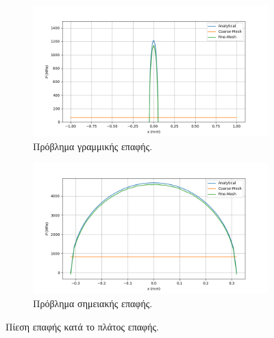 \documentclass{article}
\begin{document}
\begin{figure}[H]
    \centering
    \begin{subfigure}{0.49\linewidth}
        \centering
        \includegraphics[width=\linewidth]{media/plin.png}
        \caption{Πρόβλημα γραμμικής επαφής.}
    \end{subfigure}
    \hfill
    \begin{subfigure}{0.49\linewidth}
        \centering
        \includegraphics[width=\linewidth]{media/pp.png}
        \caption{Πρόβλημα σημειακής επαφής.}
    \end{subfigure}
    \caption{Πίεση επαφής κατά το πλάτος επαφής.}
    \label{fig:b1}
\end{figure}
\end{document}
